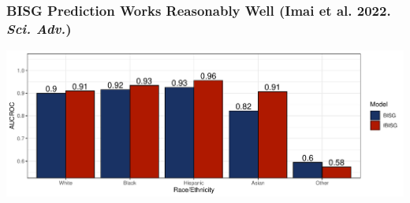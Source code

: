 \documentclass{beamer}
\begin{document}
\begin{frame}

  \frametitle{BISG Prediction Works Reasonably Well {\scriptsize (Imai
      et al. 2022. {\it Sci. Adv.})}}

  \includegraphics[width=\textwidth]{figs/AUCROC_Surnames.pdf}\\

\end{frame}
\end{document}
